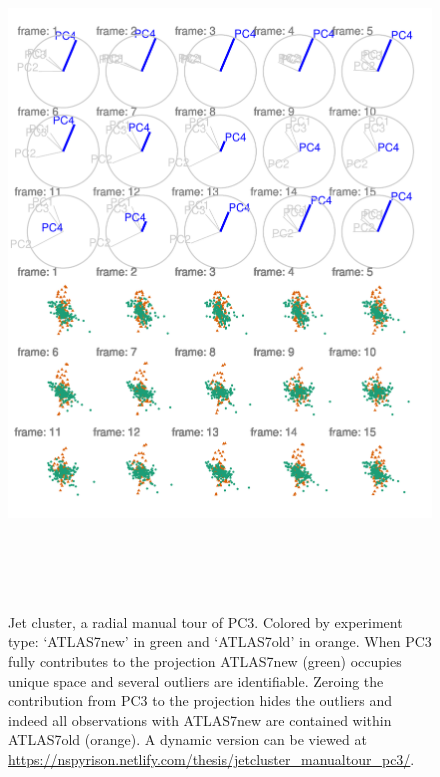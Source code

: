 \documentclass{monashthesis}
\begin{document}
\begin{figure}

{\centering \includegraphics[width=6in,height=7.2in]{./figures/JetClusterGood} 

}

\caption{Jet cluster, a radial manual tour of PC3. Colored by experiment type: `ATLAS7new' in green and `ATLAS7old' in orange. When PC3 fully contributes to the projection ATLAS7new (green) occupies unique space and several outliers are identifiable. Zeroing the contribution from PC3 to the projection hides the outliers and indeed all observations with ATLAS7new are contained within ATLAS7old (orange). A dynamic version can be viewed at \url{https://nspyrison.netlify.com/thesis/jetcluster_manualtour_pc3/}.}\label{fig:JetClusterGood}
\end{figure}
\end{document}

